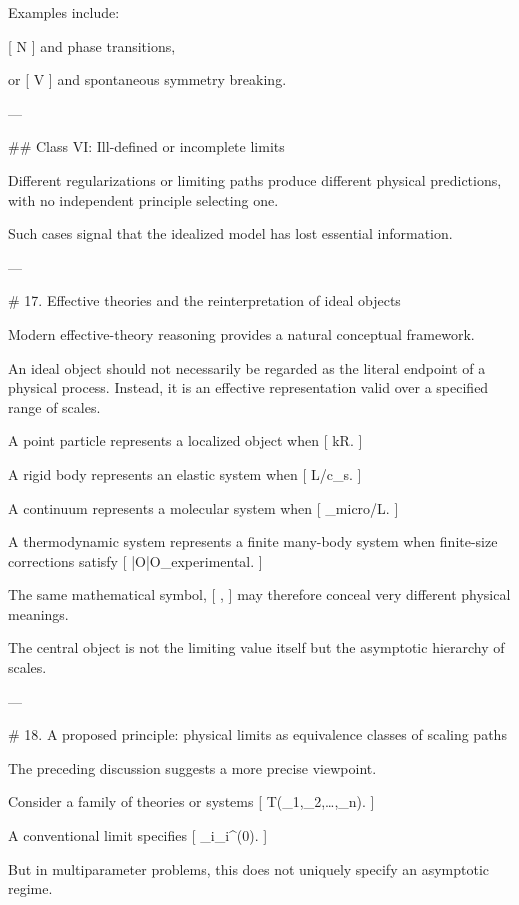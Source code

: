 Examples include:

[
N\rightarrow\infty
]
and phase transitions,

or
[
V\rightarrow\infty
]
and spontaneous symmetry breaking.

---

## Class VI: Ill-defined or incomplete limits

Different regularizations or limiting paths produce different physical predictions, with no independent principle selecting one.

Such cases signal that the idealized model has lost essential information.

---

# 17. Effective theories and the reinterpretation of ideal objects

Modern effective-theory reasoning provides a natural conceptual framework.

An ideal object should not necessarily be regarded as the literal endpoint of a physical process. Instead, it is an effective representation valid over a specified range of scales.

A point particle represents a localized object when
[
kR.
]

A rigid body represents an elastic system when
[
\omega L/c_s.
]

A continuum represents a molecular system when
[
\ell_{\rm micro}/L.
]

A thermodynamic system represents a finite many-body system when finite-size corrections satisfy
[
|\Delta O|\ll \Delta O_{\rm experimental}.
]

The same mathematical symbol,
[
\quad{}\quad
\rightarrow\infty,
]
may therefore conceal very different physical meanings.

The central object is not the limiting value itself but the asymptotic hierarchy of scales.

---

# 18. A proposed principle: physical limits as equivalence classes of scaling paths

The preceding discussion suggests a more precise viewpoint.

Consider a family of theories or systems
[
{\cal T}(\lambda_1,\lambda_2,\ldots,\lambda_n).
]

A conventional limit specifies
[
\lambda_i\rightarrow\lambda_i^{(0)}.
]

But in multiparameter problems, this does not uniquely specify an asymptotic regime.

